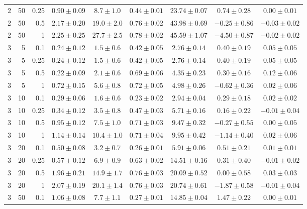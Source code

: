 \begin{table}[htbp]
\begin{tabular}{@{}rrrcccccc@{}}
2 & 50 & 0.25 & $0.90 \pm 0.09$ & $8.7 \pm 1.0$ & $0.44 \pm 0.01$ & $23.74 \pm 0.07$ & $0.74 \pm 0.28$ & $0.00 \pm 0.01$ \\
2 & 50 & 0.5 & $2.17 \pm 0.20$ & $19.0 \pm 2.0$ & $0.76 \pm 0.02$ & $43.98 \pm 0.69$ & $-0.25 \pm 0.86$ & $-0.03 \pm 0.02$ \\
2 & 50 & 1 & $2.25 \pm 0.25$ & $27.7 \pm 2.5$ & $0.78 \pm 0.02$ & $45.59 \pm 1.07$ & $-4.50 \pm 0.87$ & $-0.02 \pm 0.02$ \\
\midrule
3 & 5 & 0.1 & $0.24 \pm 0.12$ & $1.5 \pm 0.6$ & $0.42 \pm 0.05$ & $2.76 \pm 0.14$ & $0.40 \pm 0.19$ & $0.05 \pm 0.05$ \\
3 & 5 & 0.25 & $0.24 \pm 0.12$ & $1.5 \pm 0.6$ & $0.42 \pm 0.05$ & $2.76 \pm 0.14$ & $0.40 \pm 0.19$ & $0.05 \pm 0.05$ \\
3 & 5 & 0.5 & $0.22 \pm 0.09$ & $2.1 \pm 0.6$ & $0.69 \pm 0.06$ & $4.35 \pm 0.23$ & $0.30 \pm 0.16$ & $0.12 \pm 0.06$ \\
3 & 5 & 1 & $0.72 \pm 0.15$ & $5.6 \pm 0.8$ & $0.72 \pm 0.05$ & $4.98 \pm 0.26$ & $-0.62 \pm 0.36$ & $0.02 \pm 0.06$ \\
3 & 10 & 0.1 & $0.29 \pm 0.06$ & $1.6 \pm 0.6$ & $0.23 \pm 0.02$ & $2.94 \pm 0.04$ & $0.29 \pm 0.18$ & $0.02 \pm 0.02$ \\
3 & 10 & 0.25 & $0.34 \pm 0.12$ & $3.5 \pm 0.8$ & $0.47 \pm 0.03$ & $5.71 \pm 0.16$ & $0.16 \pm 0.22$ & $-0.01 \pm 0.04$ \\
3 & 10 & 0.5 & $0.95 \pm 0.12$ & $7.5 \pm 1.0$ & $0.71 \pm 0.03$ & $9.47 \pm 0.32$ & $-0.27 \pm 0.55$ & $0.00 \pm 0.05$ \\
3 & 10 & 1 & $1.14 \pm 0.14$ & $10.4 \pm 1.0$ & $0.71 \pm 0.04$ & $9.95 \pm 0.42$ & $-1.14 \pm 0.40$ & $0.02 \pm 0.06$ \\
3 & 20 & 0.1 & $0.50 \pm 0.08$ & $3.2 \pm 0.7$ & $0.26 \pm 0.01$ & $5.91 \pm 0.06$ & $0.51 \pm 0.21$ & $0.01 \pm 0.01$ \\
3 & 20 & 0.25 & $0.57 \pm 0.12$ & $6.9 \pm 0.9$ & $0.63 \pm 0.02$ & $14.51 \pm 0.16$ & $0.31 \pm 0.40$ & $-0.01 \pm 0.02$ \\
3 & 20 & 0.5 & $1.96 \pm 0.21$ & $14.9 \pm 1.7$ & $0.76 \pm 0.03$ & $20.09 \pm 0.52$ & $0.00 \pm 0.58$ & $0.03 \pm 0.03$ \\
3 & 20 & 1 & $2.07 \pm 0.19$ & $20.1 \pm 1.4$ & $0.76 \pm 0.03$ & $20.74 \pm 0.61$ & $-1.87 \pm 0.58$ & $-0.01 \pm 0.04$ \\
3 & 50 & 0.1 & $1.06 \pm 0.08$ & $7.7 \pm 1.1$ & $0.27 \pm 0.01$ & $14.85 \pm 0.04$ & $1.47 \pm 0.22$ & $0.00 \pm 0.01$ \\

\end{tabular}
\end{table}
